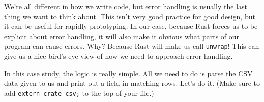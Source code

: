 \documentclass[a4paper,]{book}
\begin{document}

We're all different in how we write code, but error handling is usually
the last thing we want to think about. This isn't very good practice for
good design, but it can be useful for rapidly prototyping. In our case,
because Rust forces us to be explicit about error handling, it will also
make it obvious what parts of our program can cause errors. Why? Because
Rust will make us call \texttt{unwrap}! This can give us a nice bird's
eye view of how we need to approach error handling.

In this case study, the logic is really simple. All we need to do is
parse the CSV data given to us and print out a field in matching rows.
Let's do it. (Make sure to add \texttt{extern\ crate\ csv;} to the top
of your file.)
\end{document}
